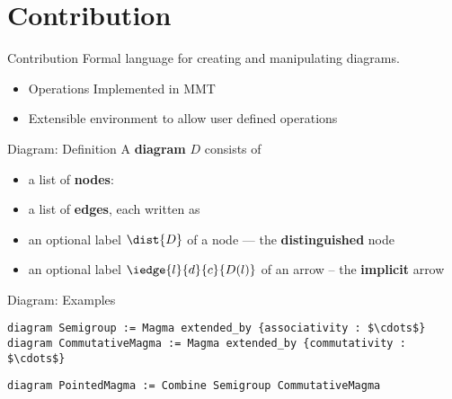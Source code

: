 \documentclass[t,12pt,numbers,fleqn,usenames,xcolor=dvipsnames]{beamer}
\begin{document}
\section{Contribution}
\begin{frame}[fragile]{Contribution}
Formal language for creating and manipulating diagrams. 
\begin{itemize}
	\item Operations Implemented in MMT 
	\item Extensible environment to allow user defined operations 
\end{itemize}
\end{frame}

\begin{frame}[fragile]{Diagram: Definition}
A \textbf{diagram} $D$ consists of
\begin{itemize}
	\item a list of \textbf{nodes}:  
	\item a list of \textbf{edges}, each written as  
	\item an optional label $\dist{D}$ of a node --- the \textbf{distinguished} node
	\item an optional label $\iedge{l}{d}{c}{D(l)}$ of an arrow -- the \textbf{implicit} arrow 
\end{itemize}
\end{frame}

\begin{frame}[fragile]{Diagram: Examples}
\scriptsize{
	\begin{lstlisting}
diagram Semigroup := Magma extended_by {associativity : $\cdots$}
diagram CommutativeMagma := Magma extended_by {commutativity : $\cdots$}
	\end{lstlisting}}
\begin{center}
\end{center}
\scriptsize{
	\begin{lstlisting}
diagram PointedMagma := Combine Semigroup CommutativeMagma
	\end{lstlisting}}
\end{frame}
\end{document}
